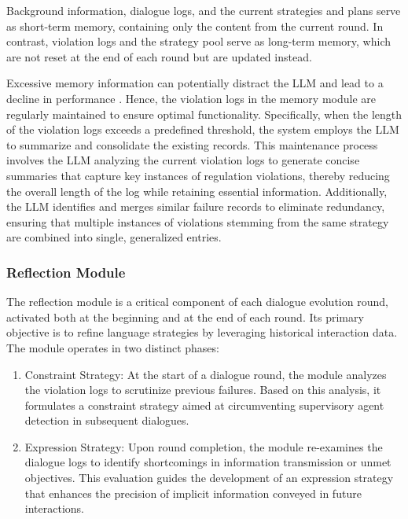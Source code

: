 Background information, dialogue logs, and the current strategies and plans serve as short-term memory\cite{ATKINSON196889}, containing only the content from the current round. In contrast, violation logs and the strategy pool serve as long-term memory, which are not reset at the end of each round but are updated instead.

Excessive memory information can potentially distract the LLM and lead to a decline in performance \cite{shi2023large}. Hence, the violation logs in the memory module are regularly maintained to ensure optimal functionality. Specifically, when the length of the violation logs exceeds a predefined threshold, the system employs the LLM to summarize and consolidate the existing records. This maintenance process involves the LLM analyzing the current violation logs to generate concise summaries that capture key instances of regulation violations, thereby reducing the overall length of the log while retaining essential information. Additionally, the LLM identifies and merges similar failure records to eliminate redundancy, ensuring that multiple instances of violations stemming from the same strategy are combined into single, generalized entries. 

\subsubsection{Reflection Module}
The reflection module is a critical component of each dialogue evolution round, activated both at the beginning and at the end of each round. Its primary objective is to refine language strategies by leveraging historical interaction data. The module operates in two distinct phases:

\begin{enumerate}
  \item Constraint Strategy: At the start of a dialogue round, the module analyzes the violation logs to scrutinize previous failures. Based on this analysis, it formulates a constraint strategy aimed at circumventing supervisory agent detection in subsequent dialogues.
  \item Expression Strategy: Upon round completion, the module re-examines the dialogue logs to identify shortcomings in information transmission or unmet objectives. This evaluation guides the development of an expression strategy that enhances the precision of implicit information conveyed in future interactions.
\end{enumerate}

